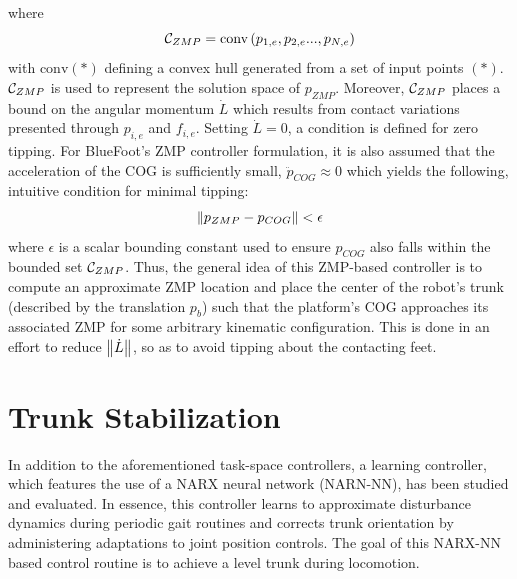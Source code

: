 		where
			\begin{equation}
				{\cal C}_{ZMP} = \text{conv}\left(p_{1,e},p_{2,e}...,p_{N,e}\right)
			\end{equation}
		with $\text{conv}(*)$ defining a convex hull generated from a set of input points $(*)$. ${\cal C}_{ZMP}$ is used to represent the solution space of $p_{ZMP}$. Moreover, ${\cal C}_{ZMP}$ places a bound on the angular momentum $\dot{L}$ which results from contact variations presented through $p_{i,e}$ and $f_{i,e}$. Setting $\dot{L}=0$, a condition is defined for zero tipping. For BlueFoot's ZMP controller formulation, it is also assumed that the acceleration of the COG is sufficiently small, \IE $\ddot{p}_{COG}\approx0$ which yields the following, intuitive condition for minimal tipping:
			\begin{equation}
				\left\lVert p_{ZMP} - p_{COG}\right\rVert < \epsilon
			\end{equation}
		where $\epsilon$ is a scalar bounding constant used to ensure $p_{COG}$ also falls within the bounded set ${\cal C}_{ZMP}$. Thus, the general idea of this ZMP-based controller is to compute an approximate ZMP location and place the center of the robot's trunk (described by the translation $p_{b}$) such that the platform's COG approaches its associated ZMP for some arbitrary kinematic configuration. This is done in an effort to reduce $\left\lVert\dot{L}\right\rVert$, so as to avoid tipping about the contacting feet.







	\section{Trunk Stabilization}

		In addition to the aforementioned task-space controllers, a learning controller, which features the use of a NARX neural network (NARN-NN), has been studied and evaluated. In essence, this controller learns to approximate disturbance dynamics during periodic gait routines and corrects trunk orientation by administering adaptations to joint position controls. The goal of this NARX-NN based control routine is to achieve a level trunk during locomotion.
		
